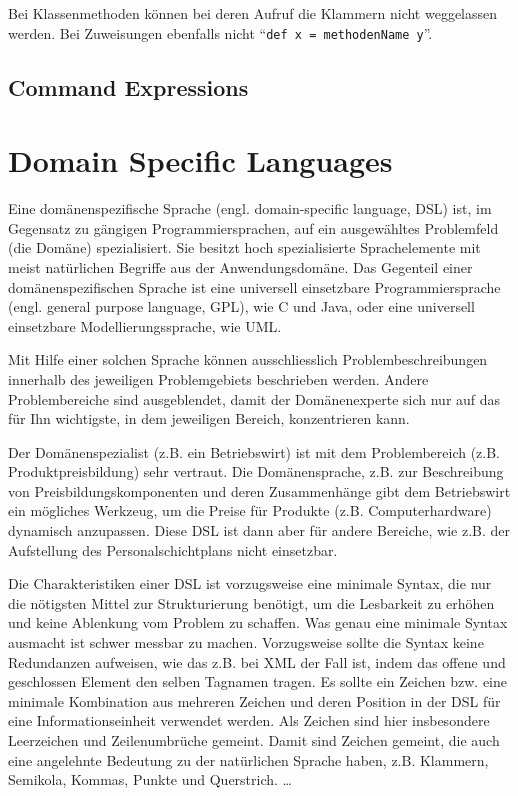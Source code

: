 \documentclass[11pt,english,ngerman, headsepline]{scrreprt}
\begin{document}
Bei Klassenmethoden können bei deren Aufruf die
Klammern nicht weggelassen werden. Bei Zuweisungen ebenfalls nicht ``\texttt{def
x = methodenName y}''.
 
 \subsection{Command Expressions}

\section{Domain Specific Languages}
 

Eine domänenspezifische Sprache (engl. domain-specific language, DSL) ist, im
Gegensatz zu gängigen Programmiersprachen, auf ein ausgewähltes
 Problemfeld (die Domäne) spezialisiert. Sie besitzt hoch spezialisierte
Sprachelemente mit meist natürlichen Begriffe aus der Anwendungsdomäne.
Das Gegenteil einer domänenspezifischen Sprache ist eine universell einsetzbare
Programmiersprache (engl. general purpose language, GPL), wie C und Java, oder
eine universell einsetzbare Modellierungssprache, wie UML.

Mit Hilfe einer solchen Sprache können ausschliesslich Problembeschreibungen
innerhalb des jeweiligen Problemgebiets beschrieben werden.
Andere Problembereiche sind ausgeblendet, damit der Domänenexperte sich
nur auf das für Ihn wichtigste, in dem jeweiligen Bereich, konzentrieren kann.

Der Domänenspezialist (z.B. ein Betriebswirt) ist mit dem Problembereich (z.B.
Produktpreisbildung) sehr vertraut. Die Domänensprache, z.B. zur Beschreibung
von Preisbildungskomponenten und deren Zusammenhänge gibt dem Betriebswirt ein
mögliches Werkzeug, um die Preise für Produkte (z.B. Computerhardware) dynamisch
anzupassen. Diese DSL ist dann aber für andere Bereiche, wie z.B.
der Aufstellung des Personalschichtplans nicht einsetzbar.

Die Charakteristiken einer DSL ist vorzugsweise eine minimale Syntax, die nur
die nötigsten Mittel zur Strukturierung benötigt, um die Lesbarkeit zu erhöhen
und keine Ablenkung vom Problem zu schaffen. 
Was genau eine minimale Syntax ausmacht ist schwer messbar zu machen.
Vorzugsweise sollte die Syntax keine Redundanzen aufweisen, wie das z.B. bei
XML der Fall ist, indem das offene und geschlossen Element den selben
Tagnamen tragen. Es sollte ein Zeichen bzw. eine minimale
Kombination aus mehreren Zeichen und deren Position in der DSL für eine Informationseinheit
verwendet werden. Als Zeichen sind hier insbesondere Leerzeichen und
Zeilenumbrüche gemeint. Damit sind Zeichen gemeint, die auch eine angelehnte
Bedeutung zu der natürlichen Sprache haben, z.B. Klammern, Semikola, Kommas,
Punkte und Querstrich. \ldots
\end{document}
